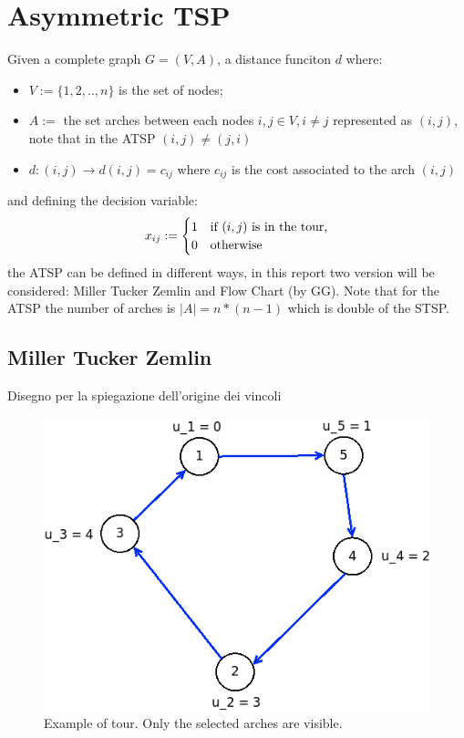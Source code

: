 \section{Asymmetric TSP}
Given a complete graph $ G = (V,A) $, a distance funciton  $ d $ where:
\begin{itemize}
	\item $ V:= \{1, 2, .., n\} $ is the set of nodes;
	\item $ A := $ the set arches between each nodes $ i,j \in V, i \ne j$ represented as $ (i,j) $, note that in the ATSP $ (i,j) \ne (j,i) $ 
	\item $ d: (i,j) \rightarrow d(i,j) = c_{ij} $ where $ c_{ij} $ is the cost associated to the arch $ (i,j) $
\end{itemize}
and defining the decision variable:
\[
x_{ij} := \begin{cases}
1 & \text{if $ (i,j) $ is in the tour,} \\
0 & \text{otherwise}
\end{cases}
\]
the ATSP can be defined in different ways, in this report two version will be considered: Miller Tucker Zemlin and Flow Chart (by GG).
Note that for the ATSP the number of arches is $ |A| = n*(n-1) $ which is double of the STSP.

\subsection{Miller Tucker Zemlin}
Disegno per la spiegazione dell'origine dei vincoli


\begin{figure}[h]
	\centering
	\includegraphics[width=.3\columnwidth]{img/asymTSP_MTZ_example.png}
	\caption{Example of tour. Only the selected arches are visible.}
	\label{fig:asymTSP_MTZ}
\end{figure}

